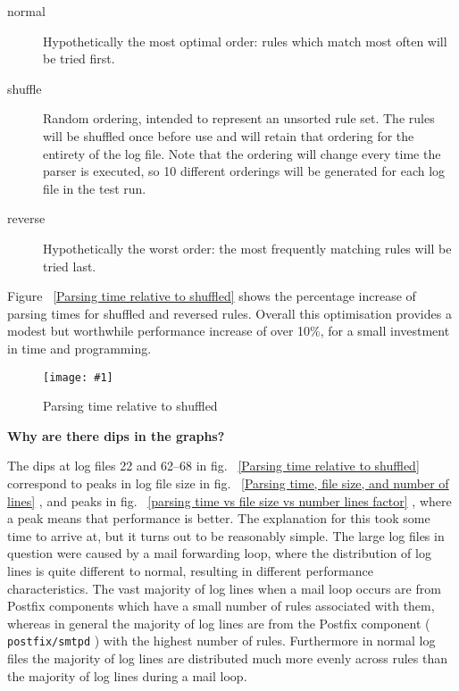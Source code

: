 \documentclass[draft]{svmult}
\newcommand{\showgraph}[3]{%
    \begin{figure}[hbt!]%
        \caption{#2}\label{#3}%
        \texttt{[image: \#1]}%
    \end{figure}%
}
\newcommand{\refwithpage}[1]{%
    \empty{}\vref{#1}%
}
\newcommand{\daemon}[1]{%
    \texttt{postfix/#1}%
}
\begin{document}
\begin{description}

    \item [normal]  Hypothetically the most optimal order: rules which
        match most often will be tried first.

    \item [shuffle] Random ordering, intended to represent an unsorted rule
        set.  The rules will be shuffled once before use and will retain
        that ordering for the entirety of the log file.  Note that the
        ordering will change every time the parser is executed, so 10
        different orderings will be generated for each log file in the test
        run.

    \item [reverse] Hypothetically the worst order: the most frequently
        matching rules will be tried last.

\end{description}

Figure~\refwithpage{Parsing time relative to shuffled} shows the percentage
increase of parsing times for shuffled and reversed rules.  Overall this
optimisation provides a modest but worthwhile performance increase of over
10\%, for a small investment in time and programming.
\showgraph{build/plot-normal-and-reverse-relative-to-shuffle}{Parsing time
relative to shuffled}{Parsing time relative to shuffled}

\noindent\textbf{Why are there dips in the graphs?}

\label{Why are there dips in the graphs?}

The dips at log files 22 and 62--68 in fig.~\refwithpage{Parsing time
relative to shuffled} correspond to peaks in log file size in
fig.~\refwithpage{Parsing time, file size, and number of lines}, and
peaks in fig.~\refwithpage{parsing time vs file size vs number lines
factor}, where a peak means that performance is better.  The explanation
for this took some time to arrive at, but it turns out to be reasonably
simple.  The large log files in question were caused by a mail forwarding
loop, where the distribution of log lines is quite different to normal,
resulting in different performance characteristics.  The vast majority of
log lines when a mail loop occurs are from Postfix components which have a
small number of rules associated with them, whereas in general the majority
of log lines are from the Postfix component (\daemon{smtpd}) with the
highest number of rules.  Furthermore in normal log files the majority of
log lines are distributed much more evenly across rules than the majority
of log lines during a mail loop.
\end{document}
